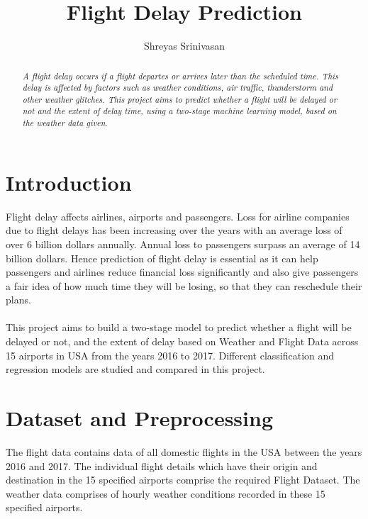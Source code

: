 \documentclass[12pt,letter-paper]{article}
\begin{document}
\title{Flight Delay Prediction}
\author{Shreyas Srinivasan}
\date{}
\maketitle

\begin{abstract}
    \textit{A flight delay occurs if a flight departes or arrives later than the scheduled time. This delay is affected by factors such as weather conditions, air traffic, thunderstorm and other weather glitches. This project aims to predict whether a flight will be delayed or not and the extent of delay time, using a two-stage machine learning model, based on the weather data given.}
\end{abstract}


\section{Introduction}

    Flight delay affects airlines, airports and passengers. Loss for airline companies due to flight delays has been increasing over the years with an average loss of over 6 billion dollars annually. Annual loss to passengers surpass an average of 14 billion dollars. Hence prediction of flight delay is essential as it can help passengers and airlines reduce financial loss significantly and also give passengers a fair idea of how much time they will be losing, so that they can reschedule their plans.
    \paragraph{}
    This project aims to build a two-stage model to predict whether a flight will be delayed or not, and the extent of delay based on Weather and Flight Data across 15 airports in USA from the years 2016 to 2017. Different classification and regression models are studied and compared in this project.
    
\section{Dataset and Preprocessing}
   
     The flight data contains data of all domestic flights in the USA between the years 2016 and 2017. The individual flight details which have their origin and destination in the 15 specified airports comprise the required Flight Dataset. The weather data comprises of hourly weather conditions recorded in these 15 specified airports.
\end{document}
